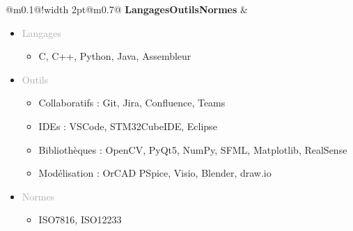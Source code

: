 \documentclass{article}
\begin{document}
\begin{tabular}{@{\hspace{0.05\textwidth}}m{}@{\hspace{0.05\textwidth}}!{\color{secondaryBlue}\vline width 2pt}@{}m{0.7\textwidth}@{}}
    \textcolor{secondaryBlue}{\textbf{Langages\newline Outils\newline Normes}} & 
    \begin{itemize}[label={}, topsep=0pt, partopsep=0pt, itemsep=0pt, parsep=0pt] 
        \setlength{\itemsep}{0pt} %

        \item \textcolor{darkGray}{Langages}
        \begin{itemize}[label={\textcolor{gray!80}{\checkmark}}, topsep=0pt, partopsep=0pt, itemsep=0pt, parsep=0pt] 
            \item \textcolor{gray!80}{C, C++, Python, Java, Assembleur}
        \end{itemize}

        \item \textcolor{darkGray}{Outils}
        \begin{itemize}[label={\textcolor{gray!80}{\checkmark}}, topsep=0pt, partopsep=0pt, itemsep=0pt, parsep=0pt]
            \item \textcolor{gray!80}{Collaboratifs : Git, Jira, Confluence, Teams}
            \item \textcolor{gray!80}{IDEs : VSCode, STM32CubeIDE, Eclipse}
            \item \textcolor{gray!80}{Bibliothèques : OpenCV, PyQt5, NumPy, SFML, Matplotlib, RealSense}
            \item \textcolor{gray!80}{Modélisation : OrCAD PSpice, Visio, Blender, draw.io}
        \end{itemize}

        \item \textcolor{darkGray}{Normes}
        \begin{itemize}[label={\textcolor{gray!80}{\checkmark}}, topsep=0pt, partopsep=0pt, itemsep=0pt, parsep=0pt, after=\vspace*{-\baselineskip}] 
            \item \textcolor{gray!80}{ISO7816, ISO12233}
        \end{itemize}
    \end{itemize}
\end{tabular}
\end{document}
